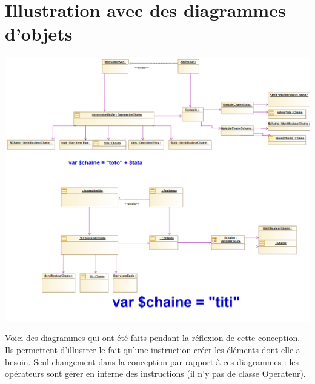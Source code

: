 \section{Illustration avec des diagrammes d'objets}
\begin{center}\includegraphics[scale=0.50]{fichiers/dossierPartieConception/img/COO/COO_prototype_1/Objet}\end{center}
\par Voici des diagrammes qui ont été faits pendant la réflexion de cette conception. Ils permettent d'illustrer le fait qu'une instruction créer les éléments dont elle a besoin. Seul changement dans la conception par rapport à ces diagrammes : les opérateurs sont gérer en interne des instructions (il n'y pas de classe Operateur).